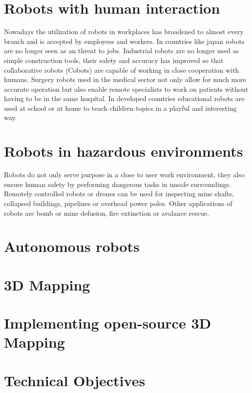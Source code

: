\section{Robots with human interaction}
Nowadays the utilization of robots in workplaces has broadened to almost every branch and is accepted by employees and workers. In countries like japan robots are no longer seen as an threat to jobs. 
Industrial robots are no longer used as simple construction tools, their safety and accuracy has improved so that collaborative robots (Cobots) are capable of working in close cooperation with humans. 
Surgery robots used in the medical sector not only allow for much more accurate operation but also enable remote specialists to work on patients without having to be in the same hospital. 
In developed countries educational robots are used at school or at home to teach children topics in a playful and interesting way.

\section{Robots in hazardous environments}
Robots do not only serve purpose in a close to user work environment, they also ensure human safety by performing dangerous tasks in unsafe surroundings. 
Remotely controlled robots or drones can be used for inspecting mine shafts, collapsed buildings, pipelines or overhead power poles.
Other applications of robots are bomb or mine defusion, fire extinction or avalance rescue.

\section{Autonomous robots}

\section{3D Mapping}

\section{Implementing open-source 3D Mapping}

\section{Technical Objectives}


\filbreak
